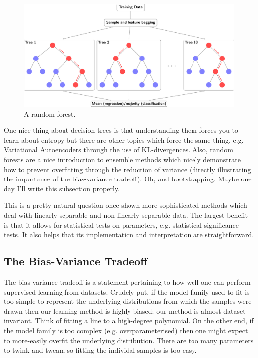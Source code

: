 \documentclass[11pt]{article}
\begin{document}
\begin{figure}[t]
    \centering
    \includegraphics[width=\columnwidth]{./figures/supervised_learning/random_forest.pdf}
    \caption{A random forest.}
    \label{fig:random_forest}
\end{figure}

One nice thing about decision trees is that understanding them forces you to learn about entropy but there are other topics which force the same thing, e.g. Variational Autoencoders through the use of KL-divergences. Also, random forests are a nice introduction to ensemble methods which nicely demonstrate how to prevent overfitting through the reduction of variance (directly illustrating the importance of the bias-variance tradeoff). Oh, and bootstrapping. Maybe one day I'll write this subsection properly.


\begin{tcolorbox}[title={\textbf{What benefits does logistic regression offer over more sophisticated methods, e.g. SVMs or random forests?}}, colback=myLightBlue, colbacktitle=myDarkBlue, colframe=myDarkBlue, coltitle=white]
    This is a pretty natural question once shown more sophisticated methods which deal with linearly separable and non-linearly separable data. The largest benefit is that it allows for statistical tests on parameters, e.g. statistical significance tests. It also helps that its implementation and interpretation are straightforward.
\end{tcolorbox}

\subsection{\REV{: }The Bias-Variance Tradeoff}
The bias-variance tradeoff is a statement pertaining to how well one can perform supervised learning from datasets. Crudely put, if the model family used to fit is too simple to represent the underlying distributions from which the samples were drawn then our learning method is highly-biased: our method is almost dataset-invariant. Think of fitting a line to a high-degree polynomial. On the other end, if the model family is too complex (e.g. overparameterised) then one might expect to more-easily overfit the underlying distribution. There are too many parameters to twink and tweam so fitting the individal samples is too easy.
\end{document}
